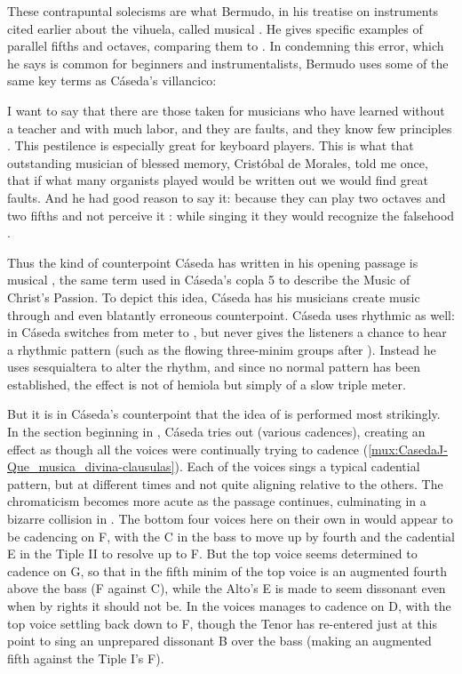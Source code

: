 These contrapuntal solecisms are what Bermudo, in his treatise on instruments
cited earlier about the vihuela, called musical .
He gives specific examples of parallel fifths and octaves, comparing them to
.
In condemning this error, which he says is common for beginners and
instrumentalists, Bermudo uses some of the same key terms as Cáseda's
villancico:
\begin{quoting}
    I want to say that there are those taken for musicians who have learned
    without a teacher and with much labor, and they are faults, and they know
    few principles .  
    This pestilence is especially great for keyboard players.  
    This is what that outstanding musician of blessed memory, Cristóbal de
    Morales, told me once, that if what many organists played would be written
    out we would find great faults.  
    And he had good reason to say it: because they can play two octaves and two
    fifths and not perceive it : while
    singing it they would recognize the falsehood .%
        \Autocite[]{Bermudo:Declaracion} 
\end{quoting}
Thus the kind of counterpoint Cáseda has written in his opening passage is
musical , the same term used in Cáseda's copla 5 to describe
the Music of Christ's Passion.
To depict this idea, Cáseda has his musicians create  music
through  and even blatantly erroneous counterpoint.
Cáseda uses rhythmic  as well: in  Cáseda
switches from \meterC{} meter to \meterCZ{}, but never gives the listeners
a chance to hear a  \meterCZ{} rhythmic pattern (such as the
flowing three-minim groups after ). 
Instead he uses sesquialtera to alter the rhythm, and since no normal
\meterCZ{} pattern has been established, the effect is not of hemiola but
simply of a slow triple meter.

But it is in Cáseda's counterpoint that the idea of  is
performed most strikingly. 
In the section beginning in , Cáseda tries out  (various cadences), creating an effect as though all the voices were
continually trying to cadence (\cref{mux:CasedaJ-Que_musica_divina-clausulas}).
Each of the voices sings a typical cadential pattern, but at different times
and not quite aligning relative to the others.
The chromaticism becomes more acute as the passage continues, culminating in a
bizarre collision in .
The bottom four voices here on their own in  would appear to be
cadencing on F, with the C in the bass to move up by fourth and the cadential E
in the Tiple II to resolve up to F.
But the top voice seems determined to cadence on G, so that in the fifth minim
of  the top voice is an augmented fourth above the bass (F\sh{}
against C), while the Alto's E is made to seem dissonant even when by rights it
should not be.
In  the voices manages to cadence on D, with the top voice settling
back down to F\sh, though the Tenor has re-entered just at this point to sing
an unprepared dissonant B\fl{} over the bass (making an augmented fifth against
the Tiple I's F\sh).

